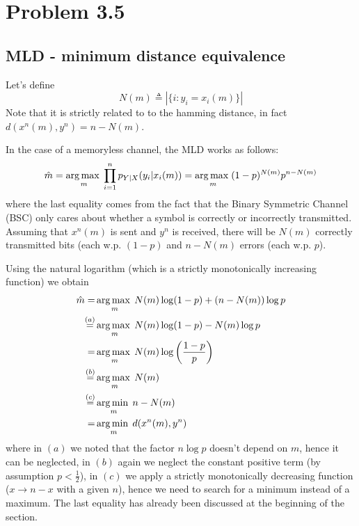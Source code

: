 \section{Problem 3.5}
\subsection{MLD - minimum distance equivalence}
Let's define
%
\begin{equation}
N(m) \triangleq \left|\{ i: y_i=x_i(m) \} \right|
\end{equation}
%
Note that it is strictly related to to the hamming distance, in fact $d(x^n(m),y^n) = n-N(m)$.

In the case of a memoryless channel, the MLD works as follows:
%
\begin{equation}
\hat{m} = \operatorname*{arg\,max\;}_m \prod_{i=1}^{n} p_{Y|X}(y_i|x_i(m)) = \operatorname*{arg\,max\;}_m (1-p)^{N(m)} p^{n-N(m)}
\end{equation}
%
where the last equality comes from the fact that the Binary Symmetric Channel (BSC) only cares about whether a symbol is correctly or incorrectly transmitted. Assuming that $x^n(m)$ is sent and $y^n$ is received, there will be $N(m)$ correctly transmitted bits (each w.p. $(1-p)$ and $n-N(m)$ errors (each w.p. $p$).

Using the natural logarithm (which is a strictly monotonically increasing function) we obtain
%
\begin{align}
\begin{split}
\hat{m} =& \operatorname*{arg\,max\;}_m N(m)\log(1-p) + (n-N(m)) \log p\\
\stackrel{(a)}{=}& \operatorname*{arg\,max\;}_m N(m)\log(1-p) -N(m) \log p\\
=& \operatorname*{arg\,max\;}_m N(m)\log\left( \frac{1-p}{p} \right)\\
\stackrel{(b)}{=}& \operatorname*{arg\,max\;}_m N(m)\\
\stackrel{(c)}{=}& \operatorname*{arg\,min\;}_m n-N(m)\\
=& \operatorname*{arg\,min\;}_m d( x^n(m),y^n)
\end{split}
\end{align}
%
where in $(a)$ we noted that the factor $n \log p$ doesn't depend on $m$, hence it can be neglected, in $(b)$ again we neglect the constant positive term (by assumption $p<\frac{1}{2}$), in $(c)$ we apply a strictly monotonically decreasing function ($x \rightarrow n-x$ with a given $n$), hence we need to search for a minimum instead of a maximum. The last equality has already been discussed at the beginning of the section.

